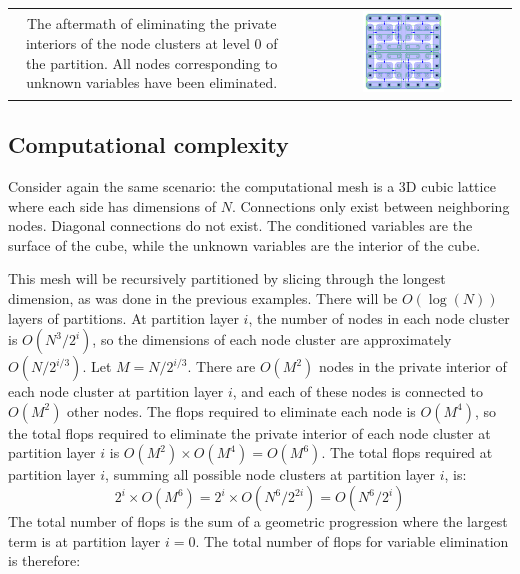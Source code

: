 \documentclass{article}
\begin{document}
\begin{center}
\begin{tabular}{cc}
\parbox{0.5\textwidth}{ 
The aftermath of eliminating the private interiors of the node clusters at level 0 of the partition. All nodes corresponding to unknown variables have been eliminated. 
} & \parbox{0.4\textwidth}{\includegraphics[width = 0.4\textwidth]{example_nested_dissection/example_nested_dissection_elimination_panel_4}} 
\end{tabular}
\end{center}



\subsection{Computational complexity}

Consider again the same scenario: the computational mesh is a 3D cubic lattice where each side has dimensions of \(N\). Connections only exist between neighboring nodes. Diagonal connections do not exist. The conditioned variables are the surface of the cube, while the unknown variables are the interior of the cube.  

This mesh will be recursively partitioned by slicing through the longest dimension, as was done in the previous examples. There will be \(O(\log(N))\) layers of partitions. At partition layer \(i\), the number of nodes in each node cluster is \(O(N^3/2^i)\), so the dimensions of each node cluster are approximately \(O(N/2^{i/3})\). Let \(M = N/2^{i/3}\). There are \(O(M^2)\) nodes in the private interior of each node cluster at partition layer \(i\), and each of these nodes is connected to \(O(M^2)\) other nodes. The flops required to eliminate each node is \(O(M^4)\), so the total flops required to eliminate the private interior of each node cluster at partition layer \(i\) is \(O(M^2) \times O(M^4) = O(M^6)\). The total flops required at partition layer \(i\), summing all possible node clusters at partition layer \(i\), is: 
\[2^i \times O(M^6) = 2^i \times O(N^6/2^{2i}) = O(N^6/2^i)\]
The total number of flops is the sum of a geometric progression where the largest term is at partition layer \(i = 0\). The total number of flops for variable elimination is therefore: 
\end{document}
